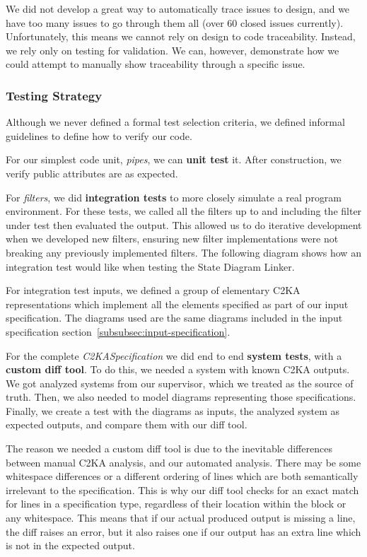 \documentclass[11pt]{article}
\begin{document}
    We did not develop a great way to automatically trace issues to design,
    and we have too many issues to go through them all (over 60 closed issues currently).
    Unfortunately, this means we cannot rely on design to code traceability.
    Instead, we rely only on testing for validation.
    We can, however, demonstrate how we could attempt to manually show traceability through a specific issue.

    \newpage
    \subsubsection{Testing Strategy}\label{subsubsec:tests-strat}
    Although we never defined a formal test selection criteria,
    we defined informal guidelines to define how to verify our code.

    For our simplest code unit, \textit{pipes}, we can \textbf{unit test} it.
    After construction, we verify public attributes are as expected.

    For \textit{filters}, we did \textbf{integration tests} to more closely simulate a real program environment.
    For these tests, we called all the filters up to and including the filter under test then evaluated the output.
    This allowed us to do iterative development when we developed new filters,
    ensuring new filter implementations were not breaking any previously implemented filters.
    The following diagram shows how an integration test would like when testing the State Diagram Linker.

    For integration test inputs, we defined a group of elementary C2KA representations which implement
    all the elements specified as part of our input specification.
    The diagrams used are the same diagrams included in the input specification section~\ref{subsubsec:input-specification}.

    For the complete \textit{C2KASpecification} we did end to end \textbf{system tests}, with a \textbf{custom diff tool}.
    To do this, we needed a system with known C2KA outputs.
    We got analyzed systems from our supervisor, which we treated as the source of truth.
    Then, we also needed to model diagrams representing those specifications.
    Finally, we create a test with the diagrams as inputs, the analyzed system as expected outputs,
    and compare them with our diff tool.

    The reason we needed a custom diff tool is due to the inevitable differences between manual C2KA analysis,
    and our automated analysis.
    There may be some whitespace differences or a different ordering of lines
    which are both semantically irrelevant to the specification.
    This is why our diff tool checks for an exact match for lines in a specification type,
    regardless of their location within the block or any whitespace.
    This means that if our actual produced output is missing a line, the diff raises an error,
    but it also raises one if our output has an extra line which is not in the expected output.
\end{document}
